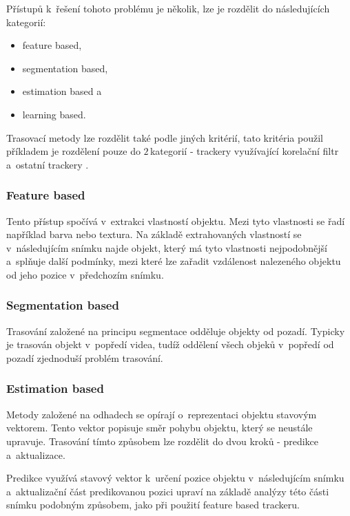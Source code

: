 Přístupů k~řešení tohoto problému je několik, lze je rozdělit do následujících kategorií:
\begin{itemize}
    \item feature based,
    \item segmentation based,
    \item estimation based a
    \item learning based.
\end{itemize}

Trasovací metody lze rozdělit také podle jiných kritérií, tato kritéria použil \cite{8964761} příkladem je rozdělení pouze do $2$\,\rm kategorií - trackery využívající korelační filtr a~ostatní trackery \citep{fiaz2018tracking}.

\subsubsection{Feature based}

Tento přístup spočívá v~extrakci vlastností objektu. Mezi tyto vlastnosti se řadí například barva nebo textura. Na základě extrahovaných vlastností se v~následujícím snímku najde objekt, který má tyto vlastnosti nejpodobnější a~splňuje další podmínky, mezi které lze zařadit vzdálenost nalezeného objektu od jeho pozice v~předchozím snímku.

\subsubsection{Segmentation based}

Trasování založené na principu segmentace odděluje objekty od pozadí. Typicky je trasován objekt v~popředí videa, tudíž oddělení všech objeků v~popředí od pozadí zjednoduší problém trasování.

\subsubsection{Estimation based}

Metody založené na odhadech se opírají o~reprezentaci objektu stavovým vektorem. Tento vektor popisuje směr pohybu objektu, který se neustále upravuje. Trasování tímto způsobem lze rozdělit do dvou kroků - predikce a~aktualizace.

Predikce využívá stavový vektor k~určení pozice objektu v~následujícím snímku a~aktualizační část predikovanou pozici upraví na základě analýzy této části snímku podobným způsobem, jako při použití feature based trackeru.

